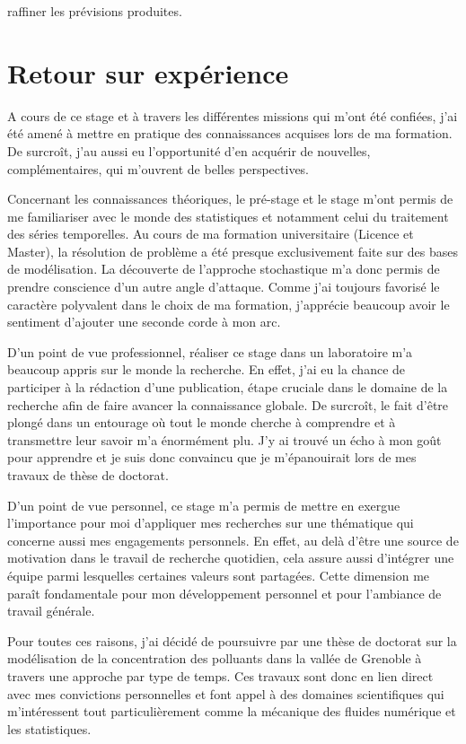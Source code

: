 \documentclass[12pt, french]{report}
\begin{document}
raffiner les prévisions produites.


\chapter{Retour sur expérience}





A cours de ce stage et à travers les différentes missions qui m'ont été confiées, j'ai été amené à mettre en pratique des connaissances acquises lors de ma formation. De surcroît, j'au aussi eu l'opportunité d'en acquérir de nouvelles, complémentaires, qui m'ouvrent de belles perspectives.

Concernant les connaissances théoriques, le pré-stage et le stage m'ont permis de me familiariser avec le monde des statistiques et notamment celui du traitement des séries temporelles. Au cours de ma formation universitaire (Licence et Master), la résolution de problème a été presque exclusivement faite sur des bases de modélisation. La découverte de l'approche stochastique m'a donc permis de prendre conscience d'un autre angle d'attaque. Comme j'ai toujours favorisé le caractère polyvalent dans le choix de ma formation, j'apprécie beaucoup avoir le sentiment d'ajouter une seconde corde à mon arc.

D'un point de vue professionnel, réaliser ce stage dans un laboratoire m'a beaucoup appris sur le monde la recherche. En effet, j'ai eu la chance de participer à la rédaction d'une publication, étape cruciale dans le domaine de la recherche afin de faire avancer la connaissance globale. De surcroît, le fait d'être plongé dans un entourage où tout le monde cherche à comprendre et à transmettre leur savoir m'a énormément plu.  J'y ai trouvé un écho à mon goût pour apprendre et je suis donc convaincu que je m'épanouirait lors de mes travaux de thèse de doctorat.

D'un point de vue personnel, ce stage m'a permis de mettre en exergue l'importance pour moi d'appliquer mes recherches sur une thématique qui concerne aussi mes engagements personnels. En effet, au delà d'être une source de motivation dans le travail de recherche quotidien, cela assure aussi d'intégrer une équipe parmi lesquelles certaines valeurs sont partagées. Cette dimension me paraît fondamentale pour mon développement personnel et pour l'ambiance de travail générale.

Pour toutes ces raisons, j'ai décidé de poursuivre par une thèse de doctorat sur la modélisation de la concentration des polluants dans la vallée de Grenoble à travers une approche par type de temps. Ces travaux sont donc en lien direct avec mes convictions personnelles et font appel à des domaines scientifiques qui m'intéressent tout particulièrement comme la mécanique des fluides numérique et les statistiques.
\end{document}
